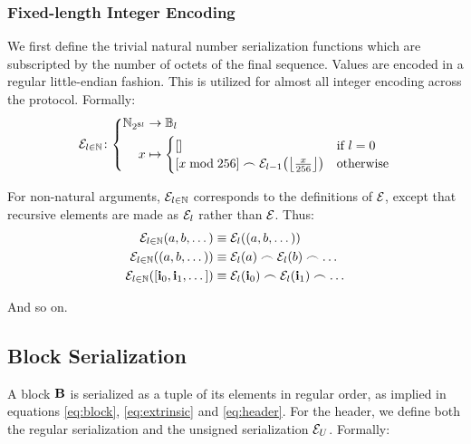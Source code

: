 \subsubsection{Fixed-length Integer Encoding}
We first define the trivial natural number serialization functions which are subscripted by the number of octets of the final sequence. Values are encoded in a regular little-endian fashion. This is utilized for almost all integer encoding across the protocol. Formally:
\begin{equation}
  \fnencode[l \in \N]\colon\abracegroup{
    \Nbits{8l} &\to \blob[l] \\
    x &\mapsto \begin{cases}
      \sq{} &\when l = 0 \\
      \sq{x \bmod 256} \concat \encode[l - 1]{\floor{\frac{x}{256}}} &\otherwise
    \end{cases}
  }
\end{equation}

For non-natural arguments, $\fnencode[l \in \N]$ corresponds to the definitions of $\fnencode$, except that recursive elements are made as $\fnencode[l]$ rather than $\fnencode$. Thus:
\begin{align}
  \encode[l \in \N]{a, b, \dots} &\equiv \encode[l]{\tup{a, b, \dots}}\\
  \encode[l \in \N]{\tup{a, b, \dots}} &\equiv \encode[l]{a} \concat \encode[l]{b} \concat \dots\\
  \encode[l \in \N]{\sq{\mathbf{i}_0, \mathbf{i}_1, \dots}} &\equiv \encode[l]{\mathbf{i}_0} \concat \encode[l]{\mathbf{i}_1} \concat \dots
\end{align}

And so on.

\subsection{Block Serialization}

A block $\block$ is serialized as a tuple of its elements in regular order, as implied in equations \ref{eq:block}, \ref{eq:extrinsic} and \ref{eq:header}. For the header, we define both the regular serialization and the unsigned serialization $\fnencodeunsignedheader$. Formally:

